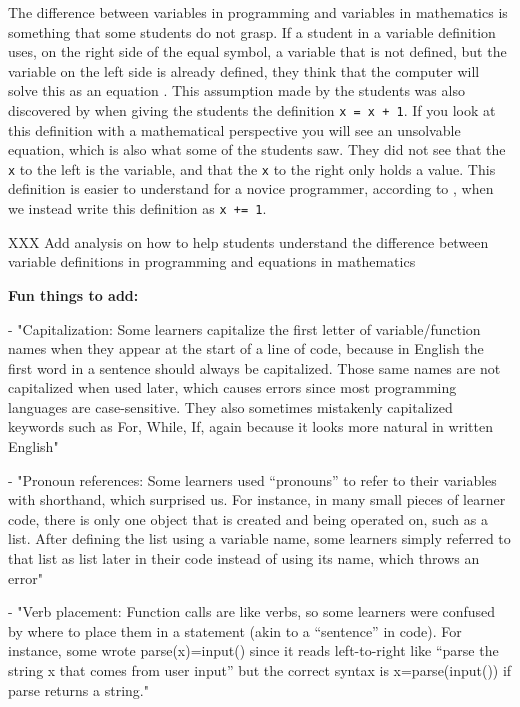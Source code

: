 The difference between variables in programming and variables in mathematics is something that some students do not grasp. If a student in a variable 
definition uses, on the right side of the equal symbol, a variable that is not 
defined, but the variable on the left side is already defined, they think that 
the computer will solve this as an equation \parencite{Plass2015Variables}. 
This assumption made by the students was also discovered by 
\textcite{Kohn2017VariableEvaluation} when giving the students the definition 
\verb'x = x + 1'. If you look at this definition with a mathematical 
perspective you will see an unsolvable equation, which is also what some of the 
students saw. They did not see that the \verb'x' to the left is the variable, 
and that the \verb'x' to the right only holds a value. This definition is  
easier to understand for a novice programmer, according to 
\textcite{Kohn2017VariableEvaluation}, when we instead write this definition as 
\verb'x += 1'. 

XXX Add analysis on how to help students understand the difference between variable definitions in programming and equations in mathematics

\textbf{Fun things to add:}

- "Capitalization: Some learners capitalize the first letter of variable/function names when they appear at the start of a line of code, because in English the first word in a sentence should always be capitalized. Those same names are not capitalized when used later, which causes errors since most programming languages are case-sensitive. They also sometimes mistakenly capitalized keywords such as For, While, If, again because it looks more natural in written English" \parencite{GuoMarkelZhang2020}

- "Pronoun references: Some learners used “pronouns” to refer to their variables with shorthand, which surprised us. For instance, in many small pieces of learner code, there is only one object that is created and being operated on, such as a list. After defining the list using a variable name, some learners simply referred to that list as list later in their code instead of using its name, which throws an error" \parencite{GuoMarkelZhang2020}

- "Verb placement: Function calls are like verbs, so some learners were confused by where to place them in a statement (akin to a “sentence” in code). For instance, some wrote parse(x)=input() since it reads left-to-right like “parse the string x that comes from user input” but the correct syntax is x=parse(input()) if parse returns a string." \parencite{GuoMarkelZhang2020}

